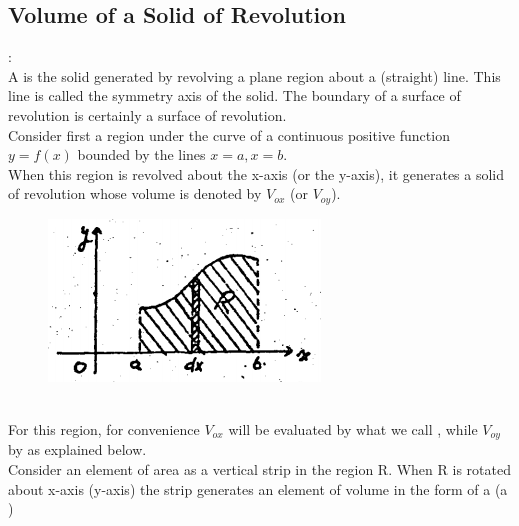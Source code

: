 \documentclass[11pt]{amsbook}
\begin{document}
\subsection{Volume of a Solid of Revolution}:
\label{subsec:VolumeofaSolidofRevolution}
\\
A  is the solid generated by revolving a plane region about a (straight) line. This line is called the symmetry axis of the solid. The boundary of a surface of revolution is certainly a surface of revolution.
\\
Consider first a region under the curve of a continuous positive function \(y=f(x)\) bounded by the lines \(x=a, x=b.\)
\\
When this region is revolved about the x-axis (or the y-axis), it generates a solid of revolution whose volume is denoted by \(V_{ox}\) (or \(V_{oy}\)).
\begin{figure}[htb]
	\centering
    \includegraphics[width=.4\textwidth]{images/b1p2-482-fig01}
\end{figure}
\\
For this region, for convenience \(V_{ox}\) will be evaluated by what we call , while \(V_{oy}\) by  as explained below.
\\
Consider an element of area as a vertical strip in the region R. When R is rotated about x-axis (y-axis) the strip generates an element of volume in the form of a  (a )
\end{document}
